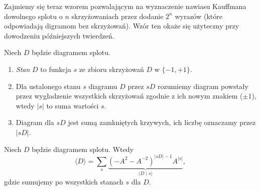 Zajmiemy się teraz wzorem pozwalającym na wyznaczenie nawiasu Kauffmana dowolnego splotu o $n$ skrzyżowaniach przez dodanie $2^n$ wyrazów (które odpowiadają digramom bez skrzyżowań).
Wzór ten okaże się użyteczny przy dowodzeniu późniejszych twierdzeń.

\begin{definition}
Niech $D$ będzie diagramem splotu.
\begin{enumerate}
\item \emph{Stan} $D$ to funkcja $s$ ze zbioru skrzyżowań $D$ w $\{-1, +1\}$.
\item Dla ustalonego stanu $s$ diagramu $D$ przez $sD$ rozumiemy diagram powstały przez wygładzenie 
wszystkich skrzyżowań zgodnie z ich nowym znakiem ($\pm 1$), wtedy $|s|$ to suma wartości $s$.
\item Diagram dla $sD$ jest sumą zamkniętych krzywych, ich liczbę oznaczamy przez $|sD|$.
\end{enumerate}
\end{definition}

\begin{proposition}
Niech $D$ będzie diagramem splotu.
Wtedy
\[\langle D\rangle = \sum_s \underbrace{(-A^2-A^{-2})^{|sD|-1} A^{|s|}}_{\langle D \mid s \rangle},\]
gdzie sumujemy po wszystkich stanach $s$ dla $D$.
\end{proposition}

